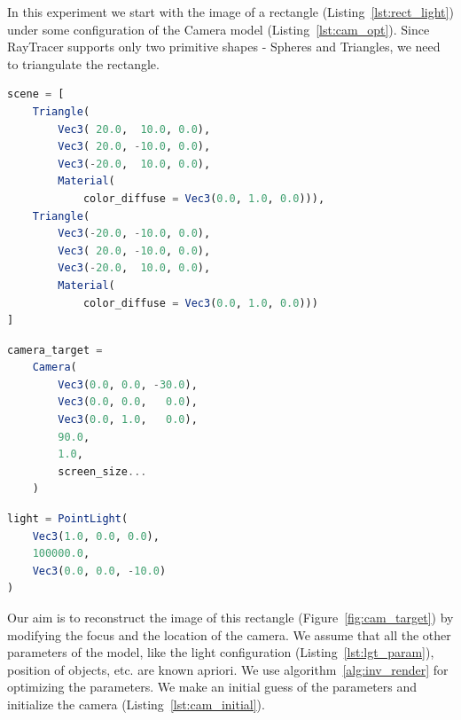 \documentclass{juliacon}
\begin{document}
In this experiment we start with the image of a rectangle (Listing~\ref{lst:rect_light}) under some configuration of the Camera model (Listing~\ref{lst:cam_opt}). Since RayTracer supports only two primitive shapes - Spheres and Triangles, we need to triangulate the rectangle.

\noindent
\begin{minipage}{\linewidth}
\begin{lstlisting}[caption = {Configuration of the Rectangle for Experiment~\ref{sec:calcam}},
                   label = {lst:rect_light},
                   captionpos = b,
                   language = Julia]
scene = [
    Triangle(
        Vec3( 20.0,  10.0, 0.0),
        Vec3( 20.0, -10.0, 0.0),
        Vec3(-20.0,  10.0, 0.0),
        Material(
            color_diffuse = Vec3(0.0, 1.0, 0.0))),
    Triangle(
        Vec3(-20.0, -10.0, 0.0),
        Vec3( 20.0, -10.0, 0.0),
        Vec3(-20.0,  10.0, 0.0),
        Material(
            color_diffuse = Vec3(0.0, 1.0, 0.0)))
]
\end{lstlisting}
\end{minipage}

\noindent
\begin{minipage}{\linewidth}
\begin{lstlisting}[caption = {Camera Parameters to be Reconstructed},
                   label = {lst:cam_opt},
                   captionpos = b,
                   language = Julia]
camera_target =
    Camera(
        Vec3(0.0, 0.0, -30.0),
        Vec3(0.0, 0.0,   0.0),
        Vec3(0.0, 1.0,   0.0),
        90.0,
        1.0,
        screen_size...
    )
\end{lstlisting}
\end{minipage}

\noindent
\begin{minipage}{\linewidth}
\begin{lstlisting}[caption = {Light Configuration},
                   label = {lst:lgt_param},
                   captionpos = b,
                   language = Julia]
light = PointLight(
    Vec3(1.0, 0.0, 0.0),
    100000.0,
    Vec3(0.0, 0.0, -10.0)
)
\end{lstlisting}
\end{minipage}

Our aim is to reconstruct the image of this rectangle (Figure~\ref{fig:cam_target}) by modifying the focus and the location of the camera. We assume that all the other parameters of the model, like the light configuration (Listing~\ref{lst:lgt_param}), position of objects, etc. are known apriori. We use algorithm~\ref{alg:inv_render} for optimizing the parameters. We make an initial guess of the parameters and initialize the camera (Listing~\ref{lst:cam_initial}).
\end{document}
